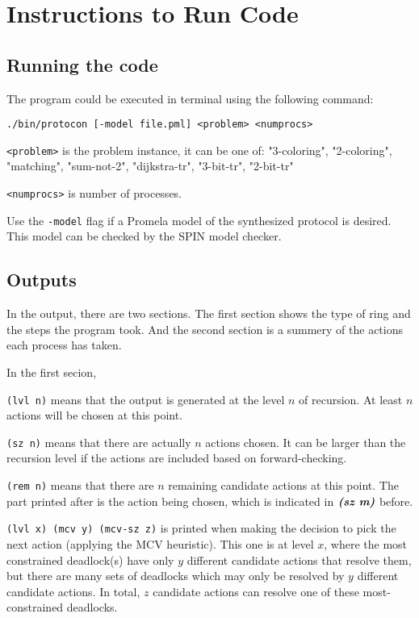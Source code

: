 \section{Instructions to Run Code}
\subsection{Running the code}
The program could be executed in terminal using the following command:

\begin{center}
\texttt{./bin/protocon [-model file.pml] <problem> <numprocs>}
\end{center}

\texttt{<problem>} is the problem instance, it can be one of:
"3-coloring", "2-coloring", "matching", "sum-not-2", "dijkstra-tr", "3-bit-tr", "2-bit-tr"

\texttt{<numprocs>} is number of processes.

Use the \texttt{-model} flag if a Promela model of the synthesized protocol is desired.
This model can be checked by the SPIN model checker.

\subsection{Outputs}
In the output, there are two sections. The first section shows the type of ring and the steps the program took. And the second section is a summery of the actions each process has taken.

In the first secion,

\texttt{(lvl n)} means that the output is generated at the level $n$ of recursion. At least $n$ actions will be chosen at this point.

\texttt{(sz n)} means that there are actually $n$ actions chosen. It can be larger than the recursion level if the actions are included based on forward-checking.

\texttt{(rem n)} means that there are $n$ remaining candidate actions at this point. The part printed after is the action being chosen, which is indicated in $\textbf{\emph{(sz\ m)}}$ before. 

\texttt{(lvl x) (mcv y) (mcv-sz z)} is printed when making the decision to pick the next action (applying the MCV heuristic). This one is at level $x$, where the most constrained deadlock(s) have only $y$ different candidate actions that resolve them, but there are many sets of deadlocks which may only be resolved by $y$ different candidate actions. In total, $z$ candidate actions can resolve one of these most-constrained deadlocks.


